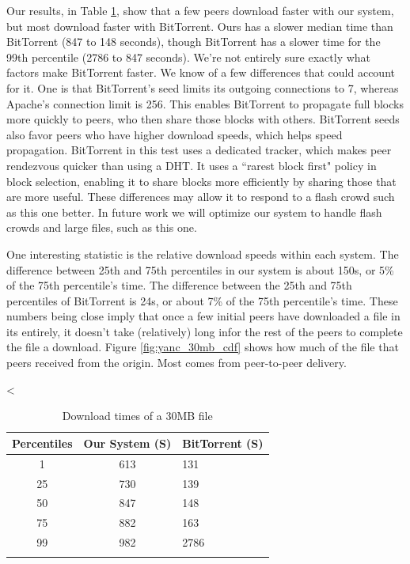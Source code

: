 Our results, in Table \ref{fig:yanc_vs_bt}, show that a few peers download 
faster with our system, but most download faster with BitTorrent. 
Ours has a slower median time than BitTorrent (847 to 148 seconds), though BitTorrent has a slower time for the 99th 
percentile (2786 to 847 seconds). We're not entirely sure exactly what factors make BitTorrent faster.
We know of a few differences that could account for it.  One is that BitTorrent's seed limits its outgoing connections
to 7, whereas Apache's connection limit is 256.  This enables BitTorrent to propagate full blocks more 
quickly to peers, who then share those blocks with others.  BitTorrent seeds also favor peers who have higher download 
speeds, which helps speed propagation.  BitTorrent in this test uses a dedicated tracker, 
which makes peer rendezvous quicker than using a DHT.  It uses a ``rarest block first" policy in block 
selection, enabling it to share blocks more efficiently by sharing those that are more useful.  These differences may allow it 
to respond to a flash crowd such as this one better.  In future work we will optimize our system to handle 
flash crowds and large files, such as this one.  

One interesting statistic is the relative download speeds within each system.
The difference between 25th and 75th percentiles in our system is about 150s, 
or 5\% of the 75th percentile's time. The difference between the 25th and 75th percentiles of BitTorrent 
is 24s, or about 7\% of the 75th percentile's time. These numbers being close imply that once 
a few initial peers have downloaded a file in its entirely, it doesn't take (relatively) long infor the rest of the peers to complete 
the file a download. Figure \ref{fig:yanc_30mb_cdf} shows how much of the file that peers received from the origin.  Most comes from peer-to-peer delivery.

<%

\begin{table}
  \caption{Download times of a 30MB file}
\begin{center}
\begin{tabular}{ c c l }
  Percentiles & Our System (S) & BitTorrent (S) \\
  \hline
  1 & 613 & 131 \\
  25 & 730 & 139 \\
  50 & 847 & 148 \\
  75 & 882 & 163 \\
  99 & 982 & 2786 \\
  \label{fig:yanc_vs_bt}
\end{tabular}
\end{center}
\end{table}


